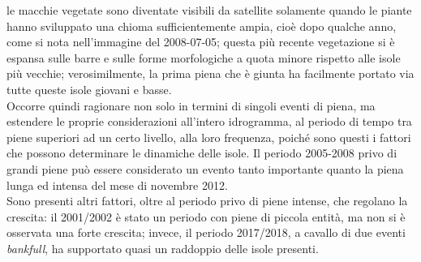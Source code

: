 le macchie vegetate sono diventate visibili da satellite solamente quando le piante hanno sviluppato una chioma sufficientemente ampia, cioè dopo qualche anno, come si nota nell'immagine del 2008-07-05;
questa più recente vegetazione si è espansa sulle barre e sulle forme morfologiche a quota minore rispetto alle isole più vecchie;
verosimilmente, la prima piena che è giunta ha facilmente portato via tutte queste isole giovani e basse.
\\
Occorre quindi ragionare non solo in termini di singoli eventi di piena, ma estendere le proprie considerazioni all'intero idrogramma, al periodo di tempo tra piene superiori ad un certo livello, alla loro frequenza, poiché sono questi i fattori che possono determinare le dinamiche delle isole.
Il periodo 2005-2008 privo di grandi piene può essere considerato un evento tanto importante quanto la piena lunga ed intensa del mese di novembre 2012.
\\
Sono presenti altri fattori, oltre al periodo privo di piene intense, che regolano la crescita: il 2001/2002 è stato un periodo con piene di piccola entità, ma non si è osservata una forte crescita; invece, il periodo 2017/2018, a cavallo di due eventi \emph{bankfull}, ha supportato quasi un raddoppio delle isole presenti.

